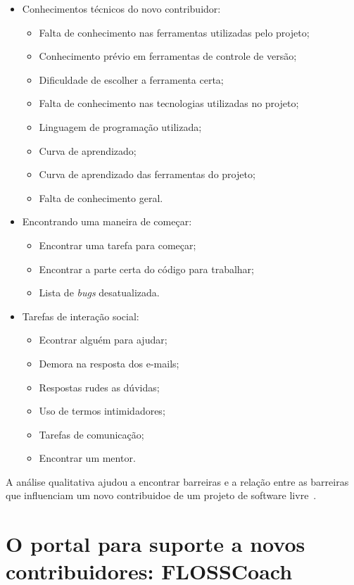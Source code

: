 \begin{itemize}
\item Conhecimentos técnicos do novo contribuidor:

	\begin{itemize}
	\item Falta de conhecimento nas ferramentas utilizadas pelo projeto;
	\item Conhecimento prévio em ferramentas de controle de versão;
	\item Dificuldade de escolher a ferramenta certa;
	\item Falta de conhecimento nas tecnologias utilizadas no projeto;
	\item Linguagem de programação utilizada;
	\item Curva de aprendizado;
	\item Curva de aprendizado das ferramentas do projeto;
	\item Falta de conhecimento geral.
	\end{itemize}

\item Encontrando uma maneira de começar:
	
	\begin{itemize}
	\item Encontrar uma tarefa para começar;
	\item Encontrar a parte certa do código para trabalhar;
	\item Lista de \textit{bugs} desatualizada.
	\end{itemize}

\item Tarefas de interação social:
	
	\begin{itemize}
	\item Econtrar alguém para ajudar;
	\item Demora na resposta dos e-mails;
	\item Respostas rudes as dúvidas;
	\item Uso de termos intimidadores;
	\item Tarefas de comunicação;
	\item Encontrar um mentor.
	\end{itemize}

\end{itemize} 

A análise qualitativa ajudou a encontrar barreiras e a relação entre as barreiras
que influenciam um novo contribuidoe de um projeto de software livre~\cite{Steinmacher:2014:HLO:2593702.2593704}.

\section{O portal para suporte a novos contribuidores: FLOSSCoach}


